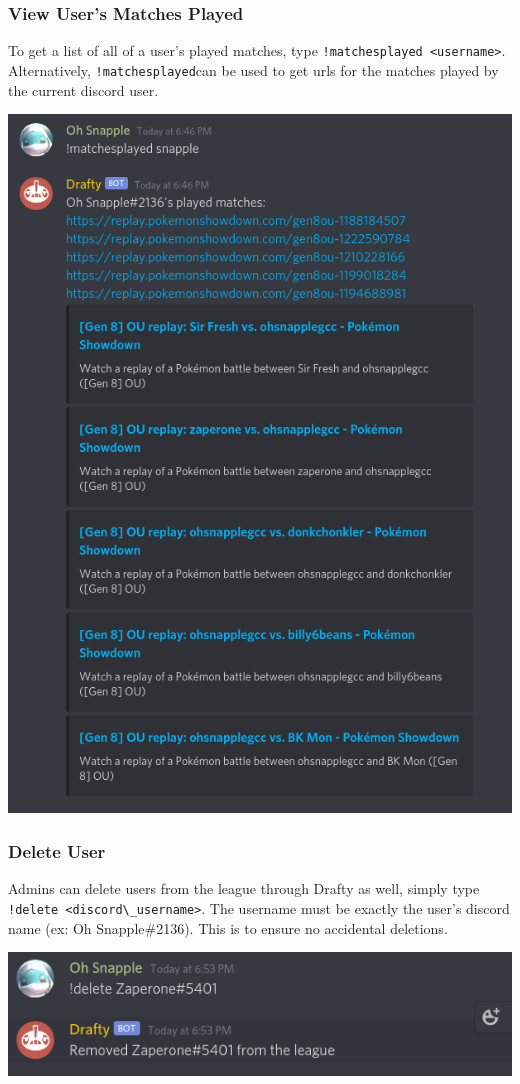\documentclass{article}
\begin{document}
\subsubsection*{View User's Matches Played}
To get a list of all of a user's played matches, type \verb|!matchesplayed <username>|.
Alternatively, \verb|!matchesplayed|can be used to get urls for the matches played by the current discord user.\\ 
\begin{center}
  \includegraphics[scale=.5]{matches_played.png}
\end{center}
\newpage
\subsubsection*{Delete User}
Admins can delete users from the league through Drafty as well, simply type \verb|!delete <discord\_username>|.
The username must be exactly the user's discord name (ex: Oh Snapple\#2136). This is to ensure no accidental deletions.\\

\begin{center}
  \includegraphics[scale=.5]{delete.png}
\end{center}
\end{document}
